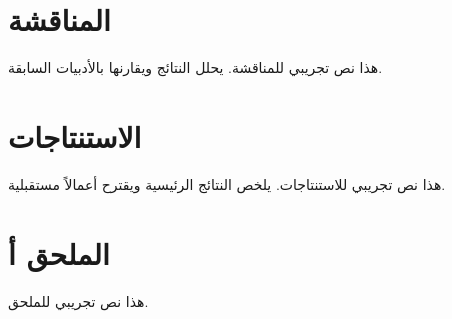 \documentclass[10pt,a4paper,twocolumn]{article}
\begin{document}
\section{المناقشة}
\label{sec:discussion}

هذا نص تجريبي للمناقشة. يحلل النتائج ويقارنها بالأدبيات السابقة.

\section{الاستنتاجات}
\label{sec:conclusion}

هذا نص تجريبي للاستنتاجات. يلخص النتائج الرئيسية ويقترح أعمالاً مستقبلية.

\onecolumn
\appendix
\section*{الملحق أ}
هذا نص تجريبي للملحق.

\printglossaries



\end{document}
